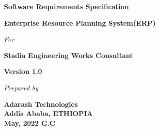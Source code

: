\begin{titlepage}
\begin{center}
		\begin{LARGE}
			\bf{Software Requirements Specification}
		\end{LARGE}
		\vspace*{30pt}
		
		{\large \textbf{Enterprise Resource Planning System(ERP)}}
		\vspace{1.5\baselineskip}
		
		\textit{For}
		\vspace{1.5\baselineskip}
		
		{\large \textbf{Stadia Engineering Works Consultant}}
		\vspace{1.5\baselineskip}	
		
		{\large \textbf{Version 1.0}}
		\vspace{3.5\baselineskip}
		
		
		\vspace{15\baselineskip}
		
		\textit{Prepared by}
		
		\textbf{Adarash Technologies\\
			Addis Ababa, ETHIOPIA\\
			May, 2022 G.C
		}
	
	\end{center}
\end{titlepage}